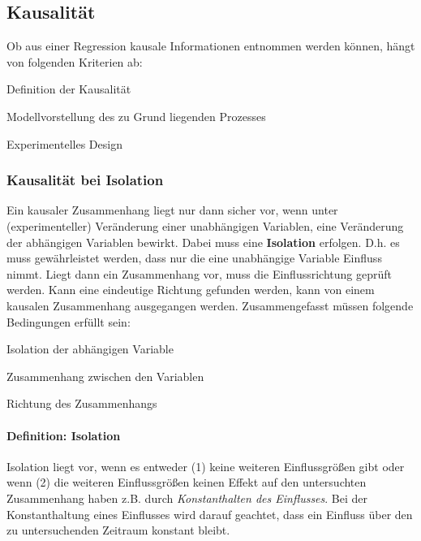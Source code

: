 \documentclass{article}
\numberwithin{equation}{section}
\begin{document}
\subsection{Kausalität}

Ob aus einer Regression kausale Informationen entnommen werden können, hängt von folgenden Kriterien ab:

\begin{compactitem}
\item Definition der Kausalität
\item Modellvorstellung des zu Grund liegenden Prozesses
\item Experimentelles Design
\end{compactitem}

\subsubsection{Kausalität bei Isolation}

Ein kausaler Zusammenhang liegt nur dann sicher vor, wenn unter (experimenteller) Veränderung einer unabhängigen Variablen, eine Veränderung der abhängigen Variablen bewirkt. Dabei muss eine \textbf{Isolation} erfolgen. D.h. es muss gewährleistet werden, dass nur die eine unabhängige Variable Einfluss nimmt. Liegt dann ein Zusammenhang vor, muss die Einflussrichtung geprüft werden. Kann eine eindeutige Richtung gefunden werden, kann von einem kausalen Zusammenhang ausgegangen werden. Zusammengefasst müssen folgende Bedingungen erfüllt sein:

\begin{compactitem}
\item Isolation der abhängigen Variable
\item Zusammenhang zwischen den Variablen
\item Richtung des Zusammenhangs
\end{compactitem}

\paragraph*{Definition: Isolation}

Isolation liegt vor, wenn es entweder (1) keine weiteren Einflussgrößen gibt oder wenn (2) die weiteren Einflussgrößen keinen Effekt auf den untersuchten Zusammenhang haben z.B. durch \emph{Konstanthalten des Einflusses}. Bei der Konstanthaltung eines Einflusses wird darauf geachtet, dass ein Einfluss über den zu untersuchenden Zeitraum konstant bleibt.
\end{document}
